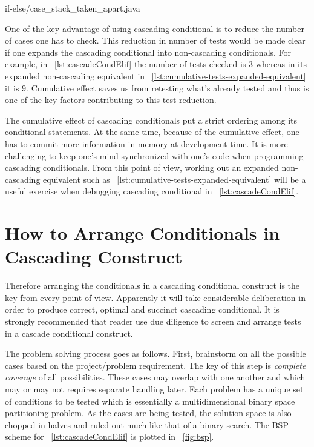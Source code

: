 \documentclass[oneside,11pt]{book}
\theoremstyle{definition}
\theoremstyle{remark}
\newcommand{\java}{Java }
\begin{document}
\begin{clisting}[tbh]
    \centering
    
    {if-else/case_stack_taken_apart.java}
\end{clisting}

One of the key advantage of using cascading conditional is to reduce the number of cases one has
to check.
This reduction in number of tests would be made clear if one expands the cascading conditional
into non-cascading conditionals.
For example, in ~\autoref{lst:cascadeCondElif} the number of tests checked is $3$
whereas in its expanded non-cascading equivalent in
~\autoref{lst:cumulative-tests-expanded-equivalent} it is $9$.
Cumulative effect saves us from retesting what's already tested and thus is one of the key factors
contributing to this test reduction.


The cumulative effect of cascading conditionals put a strict ordering among
its conditional statements.
At the same time, because of the cumulative effect, one has to commit more information in memory
at development time.
It is more challenging to keep one's mind synchronized with one's code
when programming cascading conditionals.
From this point of view, working out an expanded non-cascading equivalent such as
~\autoref{lst:cumulative-tests-expanded-equivalent} will be a useful exercise
when debugging cascading conditional in ~\autoref{lst:cascadeCondElif}.


\section{How to Arrange Conditionals in Cascading Construct}
\label{sec:orderingstaircaseconditional}

Therefore arranging the conditionals in a cascading conditional construct is the key
from every point of view.
Apparently it will take considerable deliberation in order to produce correct, optimal and succinct
cascading conditional.
It is strongly recommended that reader use due diligence to screen and arrange tests in a cascade
conditional construct.



The problem solving process goes as follows.
First, brainstorm on all the possible cases based on the project/problem requirement.
The key of this step is \emph{complete coverage} of all possibilities.
These cases may overlap with one another and which may or may not requires separate handling later.
Each problem has a unique set of conditions to be tested
which is essentially a multidimensional binary space partitioning problem\cite{NAYLOR90,NAYLOR93}.
As the cases are being tested, the solution space is also chopped in halves and
ruled out much like that of a binary search.
The BSP scheme for ~\autoref{lst:cascadeCondElif} is plotted in ~\autoref{fig:bsp}.
\end{document}
